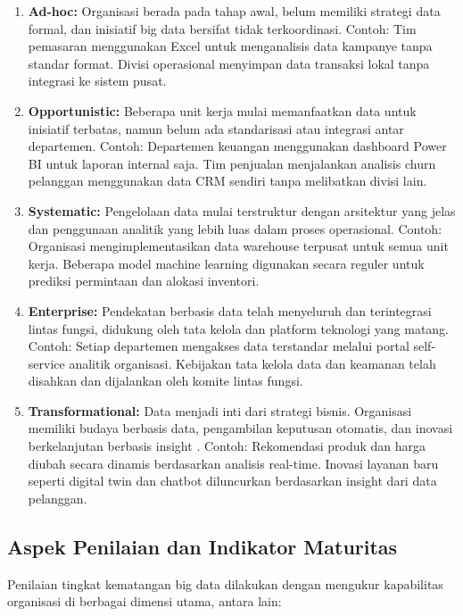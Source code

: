 \begin{enumerate}
	\item \textbf{Ad-hoc:} Organisasi berada pada tahap awal, belum memiliki strategi data formal, dan inisiatif big data bersifat tidak terkoordinasi. Contoh: Tim pemasaran menggunakan Excel untuk menganalisis data kampanye tanpa standar format. Divisi operasional menyimpan data transaksi lokal tanpa integrasi ke sistem pusat.
	
	\item \textbf{Opportunistic:} Beberapa unit kerja mulai memanfaatkan data untuk inisiatif terbatas, namun belum ada standarisasi atau integrasi antar departemen. Contoh: Departemen keuangan menggunakan dashboard Power BI untuk laporan internal saja. Tim penjualan menjalankan analisis churn pelanggan menggunakan data CRM sendiri tanpa melibatkan divisi lain.
	
	\item \textbf{Systematic:} Pengelolaan data mulai terstruktur dengan arsitektur yang jelas dan penggunaan analitik yang lebih luas dalam proses operasional. Contoh: Organisasi mengimplementasikan data warehouse terpusat untuk semua unit kerja. Beberapa model machine learning digunakan secara reguler untuk prediksi permintaan dan alokasi inventori.
	
	\item \textbf{Enterprise:} Pendekatan berbasis data telah menyeluruh dan terintegrasi lintas fungsi, didukung oleh tata kelola dan platform teknologi yang matang. Contoh: Setiap departemen mengakses data terstandar melalui portal self-service analitik organisasi. Kebijakan tata kelola data dan keamanan telah disahkan dan dijalankan oleh komite lintas fungsi.
	
	\item \textbf{Transformational:} Data menjadi inti dari strategi bisnis. Organisasi memiliki budaya berbasis data, pengambilan keputusan otomatis, dan inovasi berkelanjutan berbasis insight \cite{tdwi2013}. Contoh: Rekomendasi produk dan harga diubah secara dinamis berdasarkan analisis real-time. Inovasi layanan baru seperti digital twin dan chatbot diluncurkan berdasarkan insight dari data pelanggan.
\end{enumerate}


\subsection{Aspek Penilaian dan Indikator Maturitas}

Penilaian tingkat kematangan big data dilakukan dengan mengukur kapabilitas organisasi di berbagai dimensi utama, antara lain:

